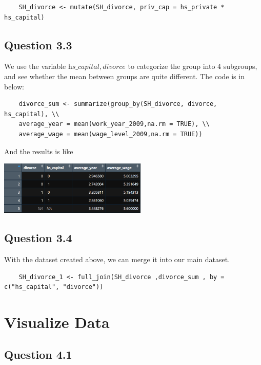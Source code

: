 \documentclass[11pt, letterpaper]{article}
\begin{document}
\begin{lstlisting}
    SH_divorce <- mutate(SH_divorce, priv_cap = hs_private * hs_capital)
\end{lstlisting}


\subsection*{Question 3.3}

We use the variable $\textit{hs}\_\textit{capital}, \textit{divorce}$ to categorize the group into 4 subgroups, and see whether the mean between groups are quite different.
The code is in below:

\begin{lstlisting}
    divorce_sum <- summarize(group_by(SH_divorce, divorce, hs_capital), \\
    average_year = mean(work_year_2009,na.rm = TRUE), \\
    average_wage = mean(wage_level_2009,na.rm = TRUE))
\end{lstlisting}

And the results is like
\begin{center}
    \includegraphics[height=1in]{divorce_sum.png}
\end{center}


\subsection*{Question 3.4}

With the dataset created above, we can merge it into our main dataset.

\begin{lstlisting}
    SH_divorce_1 <- full_join(SH_divorce ,divorce_sum , by = c("hs_capital", "divorce"))
\end{lstlisting}



\section{Visualize Data}

\subsection*{Question 4.1}
\end{document}
